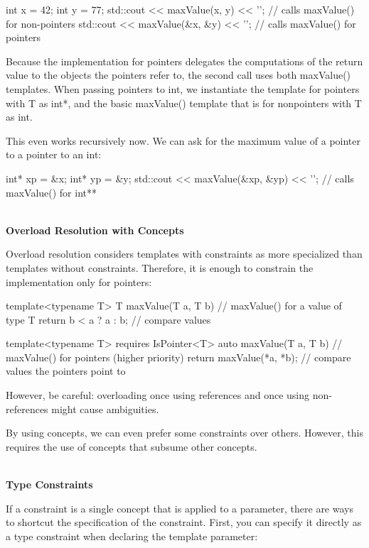\begin{cpp}
int x = 42;
int y = 77;
std::cout << maxValue(x, y) << '\n'; // calls maxValue() for non-pointers
std::cout << maxValue(&x, &y) << '\n'; // calls maxValue() for pointers
\end{cpp}

Because the implementation for pointers delegates the computations of the return value to the objects the pointers refer to, the second call uses both maxValue() templates. When passing pointers to int, we instantiate the template for pointers with T as int*, and the basic maxValue() template that is for nonpointers with T as int.

This even works recursively now. We can ask for the maximum value of a pointer to a pointer to an int:

\begin{cpp}
int* xp = &x;
int* yp = &y;
std::cout << maxValue(&xp, &yp) << '\n'; // calls maxValue() for int**
\end{cpp}

\noindent
\hspace*{\fill} \\ %
\textbf{Overload Resolution with Concepts}

Overload resolution considers templates with constraints as more specialized than templates without constraints. Therefore, it is enough to constrain the implementation only for pointers:

\begin{cpp}
template<typename T>
T maxValue(T a, T b) // maxValue() for a value of type T
{
	return b < a ? a : b; // compare values
}

template<typename T>
requires IsPointer<T>
auto maxValue(T a, T b) // maxValue() for pointers (higher priority)
{
	return maxValue(*a, *b); // compare values the pointers point to
}
\end{cpp}

However, be careful: overloading once using references and once using non-references might cause ambiguities.

By using concepts, we can even prefer some constraints over others. However, this requires the use of concepts that subsume other concepts.

\noindent
\hspace*{\fill} \\ %
\textbf{Type Constraints}

If a constraint is a single concept that is applied to a parameter, there are ways to shortcut the specification of the constraint. First, you can specify it directly as a type constraint when declaring the template parameter:

